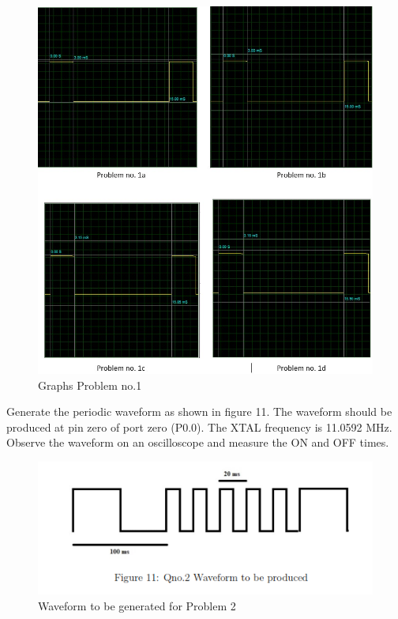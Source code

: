 \documentclass{article}
\begin{document}
\begin{figure}[H]
    \centering
    \includegraphics[scale=1,cframe=blue 0.5pt 3pt]{Prob1 graph.jpg}
    \caption{Graphs Problem no.1}
\end{figure}


\pagebreak

\begin{Q}
    {
        Generate the periodic waveform as shown in figure 11. The waveform should be produced at pin zero of port zero (P0.0). The XTAL frequency is 11.0592 MHz. Observe the waveform on an oscilloscope and measure the ON and OFF times.
    }
\end{Q}

\begin{figure}[H]
    \centering
    \includegraphics[scale=1,cframe=blue 0.5pt 3pt]{2output.png}
    \caption{Waveform to be generated for Problem 2}
\end{figure}
\end{document}
